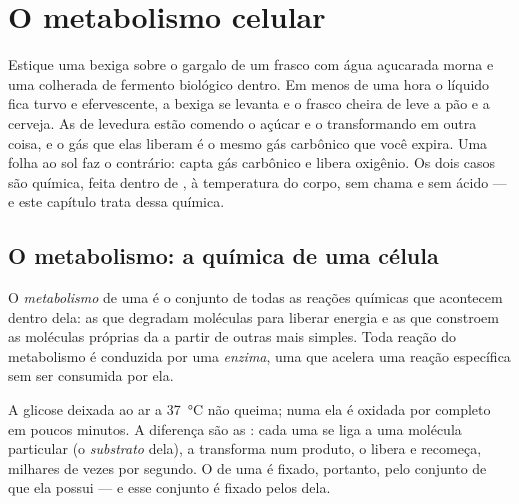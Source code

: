 \chapter{O metabolismo celular}\label{ch:g10:cell-metabolism}

Estique uma bexiga sobre o gargalo de um frasco com água açucarada
morna e uma colherada de fermento biológico dentro. Em menos de uma
hora o líquido fica turvo e efervescente, a bexiga se levanta e o
frasco cheira de leve a pão e a cerveja. As  de levedura estão
comendo o açúcar e o transformando em outra coisa, e o gás que elas
liberam é o mesmo gás carbônico que você expira. Uma folha ao sol faz o
contrário: capta gás carbônico e libera oxigênio. Os dois casos são
química, feita dentro de , à temperatura do corpo, sem chama e
sem ácido --- e este capítulo trata dessa química.

\section{O metabolismo: a química de uma célula}

\begin{definition}[Metabolismo]\label{def:g10:cell-metabolism:metabolism}
O \emph{metabolismo} de uma  é o conjunto de
todas as reações químicas que acontecem dentro dela: as que degradam
moléculas para liberar energia e as que constroem as moléculas próprias
da  a partir de outras mais simples. Toda reação do metabolismo é
conduzida por uma \emph{enzima}, uma  que acelera
uma reação específica sem ser consumida por ela.
\end{definition}

\begin{proposition}\label{prop:g10:cell-metabolism:enzymes}
A glicose deixada ao ar a \qty{37}{\celsius} não queima; numa 
ela é oxidada por completo em poucos minutos. A diferença são as
: cada uma se liga a uma molécula particular (o
\emph{substrato} dela), a transforma num produto, o libera e recomeça,
milhares de vezes por segundo. O  de uma  é fixado,
portanto, pelo conjunto de  que ela possui --- e esse conjunto é
fixado pelos  dela.
\end{proposition}
\admitted

